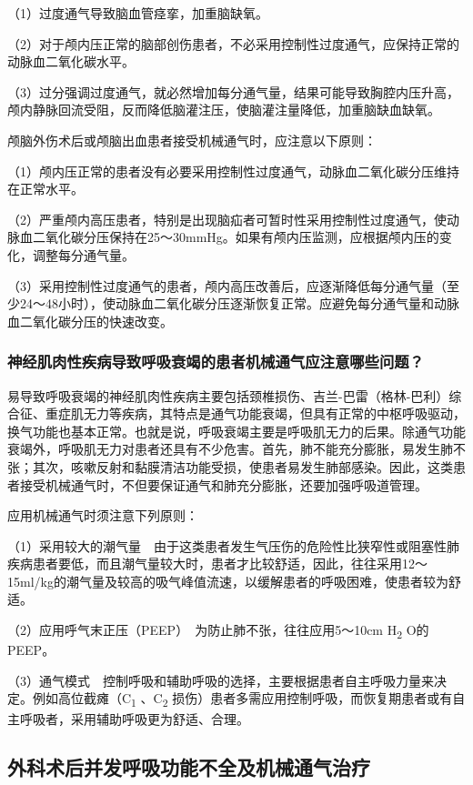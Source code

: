 （1）过度通气导致脑血管痉挛，加重脑缺氧。

（2）对于颅内压正常的脑部创伤患者，不必采用控制性过度通气，应保持正常的动脉血二氧化碳水平。

（3）过分强调过度通气，就必然增加每分通气量，结果可能导致胸腔内压升高，颅内静脉回流受阻，反而降低脑灌注压，使脑灌注量降低，加重脑缺血缺氧。

颅脑外伤术后或颅脑出血患者接受机械通气时，应注意以下原则：

（1）颅内压正常的患者没有必要采用控制性过度通气，动脉血二氧化碳分压维持在正常水平。

（2）严重颅内高压患者，特别是出现脑疝者可暂时性采用控制性过度通气，使动脉血二氧化碳分压保持在25～30mmHg。如果有颅内压监测，应根据颅内压的变化，调整每分通气量。

（3）采用控制性过度通气的患者，颅内高压改善后，应逐渐降低每分通气量（至少24～48小时），使动脉血二氧化碳分压逐渐恢复正常。应避免每分通气量和动脉血二氧化碳分压的快速改变。

\subsubsection{神经肌肉性疾病导致呼吸衰竭的患者机械通气应注意哪些问题？}

易导致呼吸衰竭的神经肌肉性疾病主要包括颈椎损伤、吉兰-巴雷（格林-巴利）综合征、重症肌无力等疾病，其特点是通气功能衰竭，但具有正常的中枢呼吸驱动，换气功能也基本正常。也就是说，呼吸衰竭主要是呼吸肌无力的后果。除通气功能衰竭外，呼吸肌无力对患者还具有不少危害。首先，肺不能充分膨胀，易发生肺不张；其次，咳嗽反射和黏膜清洁功能受损，使患者易发生肺部感染。因此，这类患者接受机械通气时，不但要保证通气和肺充分膨胀，还要加强呼吸道管理。

应用机械通气时须注意下列原则：

（1）采用较大的潮气量　由于这类患者发生气压伤的危险性比狭窄性或阻塞性肺疾病患者要低，而且潮气量较大时，患者才比较舒适，因此，往往采用12～15ml/kg的潮气量及较高的吸气峰值流速，以缓解患者的呼吸困难，使患者较为舒适。

（2）应用呼气末正压（PEEP）　为防止肺不张，往往应用5～10cm
H\textsubscript{2} O的PEEP。

（3）通气模式　控制呼吸和辅助呼吸的选择，主要根据患者自主呼吸力量来决定。例如高位截瘫（C\textsubscript{1}
、C\textsubscript{2}
损伤）患者多需应用控制呼吸，而恢复期患者或有自主呼吸者，采用辅助呼吸更为舒适、合理。

\subsection{外科术后并发呼吸功能不全及机械通气治疗}

